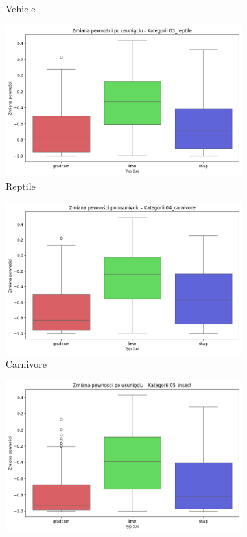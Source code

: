 \begin{figure}[h]
\begin{subfigure}[b]{0.3\textwidth}
		\caption{Vehicle}  \label{rys:base_confidence_no_exp_vehicle}
	\end{subfigure}
	\begin{subfigure}[b]{0.3\textwidth}
		\centering\includegraphics[width=.9\textwidth]{img/base_confidence_no_exp_reptile}
		\caption{Reptile}  \label{rys:base_confidence_no_exp_reptile}
	\end{subfigure}
	\begin{subfigure}[b]{0.3\textwidth}
		\centering\includegraphics[width=.9\textwidth]{img/base_confidence_no_exp_carnivore}
		\caption{Carnivore}  \label{rys:base_confidence_no_exp_carnivore}
	\end{subfigure}
	\begin{subfigure}[b]{0.3\textwidth}
		\centering\includegraphics[width=.9\textwidth]{img/base_confidence_no_exp_insect}

\end{subfigure}
\end{figure}
